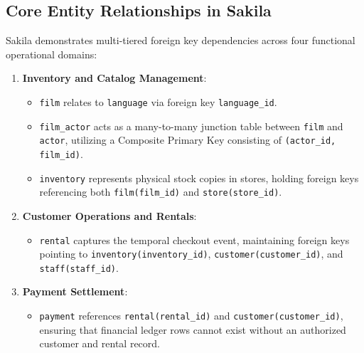 \documentclass[10pt,journal,compsoc,onecolumn]{IEEEtran}
\begin{document}
\subsection{Core Entity Relationships in Sakila}
Sakila demonstrates multi-tiered foreign key dependencies across four functional operational domains:
\begin{enumerate}
    \item \textbf{Inventory and Catalog Management}:
    \begin{itemize}
        \item \texttt{film} relates to \texttt{language} via foreign key \texttt{language\_id}.
        \item \texttt{film\_actor} acts as a many-to-many junction table between \texttt{film} and \texttt{actor}, utilizing a Composite Primary Key consisting of \texttt{(actor\_id, film\_id)}.
        \item \texttt{inventory} represents physical stock copies in stores, holding foreign keys referencing both \texttt{film(film\_id)} and \texttt{store(store\_id)}.
    \end{itemize}
    \item \textbf{Customer Operations and Rentals}:
    \begin{itemize}
        \item \texttt{rental} captures the temporal checkout event, maintaining foreign keys pointing to \texttt{inventory(inventory\_id)}, \texttt{customer(customer\_id)}, and \texttt{staff(staff\_id)}.
    \end{itemize}
    \item \textbf{Payment Settlement}:
    \begin{itemize}
        \item \texttt{payment} references \texttt{rental(rental\_id)} and \texttt{customer(customer\_id)}, ensuring that financial ledger rows cannot exist without an authorized customer and rental record.
    \end{itemize}
\end{enumerate}
\end{document}
